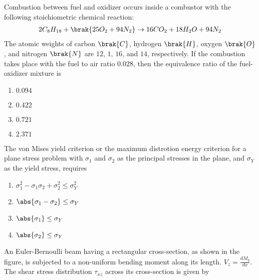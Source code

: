 \iffalse
\chapter{2007}
\author{ee24btech11018- Durgi Swaraj Sharma}
\section{ae}
\fi
	\item Combustion between fuel  and oxidizer  occurs inside a combustor with the following stoichiometric chemical reaction:
		\begin{align*}
			2C_8H_{18}+\brak{25O_2+94N_2}\to16CO_2+18H_2O+94N_2
		\end{align*}
		The atomic weights of carbon $\brak{C}$, hydrogen $\brak{H}$, oxygen $\brak{O}$, and nitrogen $\brak{N}$ are $12$, $1$, $16$, and $14$, respectively. If the combustion takes place with the fuel to air ratio $0.028$, then the equivalence ratio of the fuel-oxidizer mixture is
		\begin{enumerate}
			\item $0.094$
			\item $0.422$
			\item $0.721$
			\item $2.371$
		\end{enumerate}
	\item The von Mises yield criterion or the maximum distrotion energy criterion for a plane stress problem with $\sigma_1$ and $\sigma_2$ as the principal stresses in the plane, and $\sigma_Y$ as the yield stress, requires
		\begin{enumerate}
			\item $\sigma_1^2-\sigma_1\sigma_2+\sigma_2^2\leq\sigma_Y^2$
			\item $\abs{\sigma_1-\sigma_2} \leq \sigma_Y$
			\item $\abs{\sigma_1}\leq\sigma_Y$
			\item $\abs{\sigma_2}\leq\sigma_Y$
		\end{enumerate}
	\item An Euler-Bernoulli beam having a rectangular cross-section, as shown in the figure, is subjected to a non-uniform bending moment along its length. $V_z = \frac{dM_y}{dx}$. The shear stress distribution $\tau_{xz}$ across its cross-section is given by 
		\begin{figure}[!ht]
			
		\end{figure}

